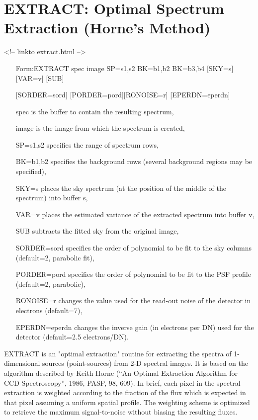\section{EXTRACT: Optimal Spectrum Extraction (Horne's Method)}
\begin{rawhtml}
<!-- linkto extract.html -->
\end{rawhtml}
\begin{itemize}
  \item[Form:EXTRACT spec image SP=s1,s2 BK=b1,b2 BK=b3,b4 {[SKY=s]} 
       {[VAR=v]} {[SUB]}\hfill]{}
  \item[{[SORDER=sord]} {[PORDER=pord]}{[RONOISE=r]} 
        {[EPERDN=eperdn]} \hfill]{}
  \item[spec\hfill]{is the buffer to contain the resulting spectrum,}
  \item[image\hfill]{is the image from which the spectrum is created,}
  \item[SP=s1,s2\hfill]{specifies the range of spectrum rows,}
  \item[BK=b1,b2\hfill]{specifies the background rows (several background
       regions may be specified),}
  \item[SKY=s\hfill]{places the sky spectrum (at the position of the
       middle of the spectrum) into buffer s,}
  \item[VAR=v\hfill]{places the estimated variance of the extracted
       spectrum into buffer v,}
  \item[SUB\hfill]{subtracts the fitted sky from the original image,}
  \item[SORDER=sord\hfill]{specifies the order of polynomial to be fit to the
       sky columns (default=2, parabolic fit),}
  \item[PORDER=pord\hfill]{specifies the order of polynomial to be fit to the
       PSF profile (default=2, parabolic),}
  \item[RONOISE=r\hfill]{changes the value used for the read-out noise of the
       detector in electrons (default=7),}
  \item[EPERDN=eperdn\hfill]{changes the inverse gain (in electrons per DN) 
       used for the detector (default=2.5 electrons/DN).}
\end{itemize}

EXTRACT is an "optimal extraction" routine for extracting the spectra of
1-dimensional sources (point-sources) from 2-D spectral images.  It is
based on the algorithm described by Keith Horne (``An Optimal Extraction
Algorithm for CCD Spectroscopy'', 1986, PASP, 98, 609).  In brief, each
pixel in the spectral extraction is weighted according to the fraction of
the flux which is expected in that pixel assuming a uniform spatial
profile.  The weighting scheme is optimized to retrieve the maximum
signal-to-noise without biasing the resulting fluxes. 

